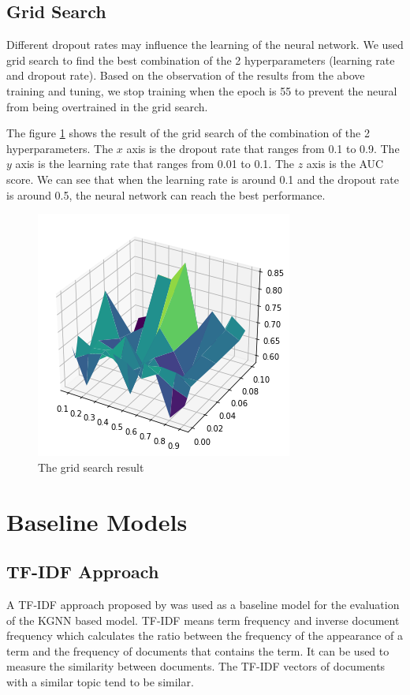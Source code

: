\documentclass[11pt,twoside]{report}
\begin{document}
\subsection{Grid Search}
Different dropout rates may influence the learning of the neural network. We used grid search to find the best combination of the 2 hyperparameters (learning rate and dropout rate). Based on the observation of the results from the above training and tuning, we stop training when the epoch is 55 to prevent the neural from being overtrained in the grid search.

The figure \ref{fig:grid search} shows the result of the grid search of the combination of the 2 hyperparameters. The $x$ axis is the dropout rate that ranges from 0.1 to 0.9. The $y$ axis is the learning rate that ranges from 0.01 to 0.1. The $z$ axis is the AUC score. We can see that when the learning rate is around 0.1 and the dropout rate is around 0.5, the neural network can reach the best performance.

\begin{figure}[H]
    \centering
    \includegraphics[scale=0.9]{grid_search.png}
    \caption{The grid search result}
    \label{fig:grid search}
\end{figure}

\section{Baseline Models}
\subsection{TF-IDF Approach}
A TF-IDF approach proposed by \cite{xu_repersp_2017,sun_personalized_2018} was used as a baseline model for the evaluation of the KGNN based model. TF-IDF means term frequency and inverse document frequency which calculates the ratio between the frequency of the appearance of a term and the frequency of documents that contains the term. It can be used to measure the similarity between documents. The TF-IDF vectors of documents with a similar topic tend to be similar.
\end{document}
